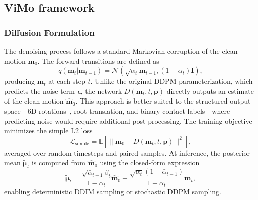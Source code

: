 \subsection{ViMo framework}
\label{subsec:framework}

\subsubsection{Diffusion Formulation}
The denoising process follows a standard Markovian corruption of the clean motion $\mathbf{m}_0$. The forward transitions are defined as
\[
q(\mathbf{m}_t|\mathbf{m}_{t-1})=\mathcal{N}(\sqrt{\alpha_t}\mathbf{m}_{t-1},(1-\alpha_t)\mathbf{I}),
\]
producing $\mathbf{m}_t$ at each step $t$. Unlike the original DDPM parameterization, which predicts the noise term $\boldsymbol{\epsilon}$, the network $D(\mathbf{m}_t,t,\mathbf{p})$ directly outputs an estimate of the clean motion $\hat{\mathbf{m}}_0$. This approach is better suited to the structured output space—6D rotations~\cite{6drot2020}, root translation, and binary contact labels—where predicting noise would require additional post-processing. The training objective minimizes the simple L2 loss
\[
\mathcal{L}_{\text{simple}}=\mathbb{E}[\|\mathbf{m}_0-D(\mathbf{m}_t,t,\mathbf{p})\|^2],
\]
averaged over random timesteps and paired samples. At inference, the posterior mean $\tilde{\boldsymbol{\mu}}_t$ is computed from $\hat{\mathbf{m}}_0$ using the closed-form expression
\[
\tilde{\boldsymbol{\mu}}_t=\frac{\sqrt{\bar{\alpha}_{t-1}}\beta_t}{1-\bar{\alpha}_t}\hat{\mathbf{m}}_0+\frac{\sqrt{\alpha_t}(1-\bar{\alpha}_{t-1})}{1-\bar{\alpha}_t}\mathbf{m}_t,
\]
enabling deterministic DDIM sampling or stochastic DDPM sampling.



